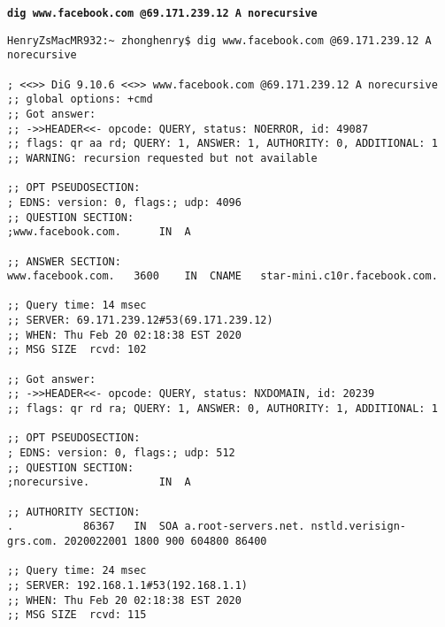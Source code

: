 \documentclass[12pt]{article}
\newcommand{\ilc}{\texttt}
\begin{document}
\textbf{\ilc{dig www.facebook.com @69.171.239.12 A norecursive}}
\begin{verbatim}
HenryZsMacMR932:~ zhonghenry$ dig www.facebook.com @69.171.239.12 A norecursive

; <<>> DiG 9.10.6 <<>> www.facebook.com @69.171.239.12 A norecursive
;; global options: +cmd
;; Got answer:
;; ->>HEADER<<- opcode: QUERY, status: NOERROR, id: 49087
;; flags: qr aa rd; QUERY: 1, ANSWER: 1, AUTHORITY: 0, ADDITIONAL: 1
;; WARNING: recursion requested but not available

;; OPT PSEUDOSECTION:
; EDNS: version: 0, flags:; udp: 4096
;; QUESTION SECTION:
;www.facebook.com.		IN	A

;; ANSWER SECTION:
www.facebook.com.	3600	IN	CNAME	star-mini.c10r.facebook.com.

;; Query time: 14 msec
;; SERVER: 69.171.239.12#53(69.171.239.12)
;; WHEN: Thu Feb 20 02:18:38 EST 2020
;; MSG SIZE  rcvd: 102

;; Got answer:
;; ->>HEADER<<- opcode: QUERY, status: NXDOMAIN, id: 20239
;; flags: qr rd ra; QUERY: 1, ANSWER: 0, AUTHORITY: 1, ADDITIONAL: 1

;; OPT PSEUDOSECTION:
; EDNS: version: 0, flags:; udp: 512
;; QUESTION SECTION:
;norecursive.			IN	A

;; AUTHORITY SECTION:
.			86367	IN	SOA	a.root-servers.net. nstld.verisign-grs.com. 2020022001 1800 900 604800 86400

;; Query time: 24 msec
;; SERVER: 192.168.1.1#53(192.168.1.1)
;; WHEN: Thu Feb 20 02:18:38 EST 2020
;; MSG SIZE  rcvd: 115
\end{verbatim}
\end{document}
